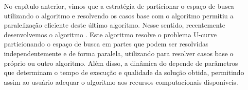 No capítulo anterior, vimos que a estratégia de particionar o espaço de busca utilizando o algoritmo  e resolvendo os casos base com o algoritmo  permitiu a paralelização eficiente deste último algoritmo. Nesse sentido, recentemente desenvolvemos o algoritmo . Este algoritmo resolve o problema U-curve particionando o espaço de busca em 
partes que podem ser resolvidas independentemente e de forma paralela, utilizando para resolver casos base o próprio  ou outro algoritmo. 
Além disso, a dinâmica do  depende de parâmetros que 
determinam o tempo de execução e qualidade da solução obtida, permitindo assim
ao usuário adequar o algoritmo aos recursos computacionais disponíveis. 


%
%

